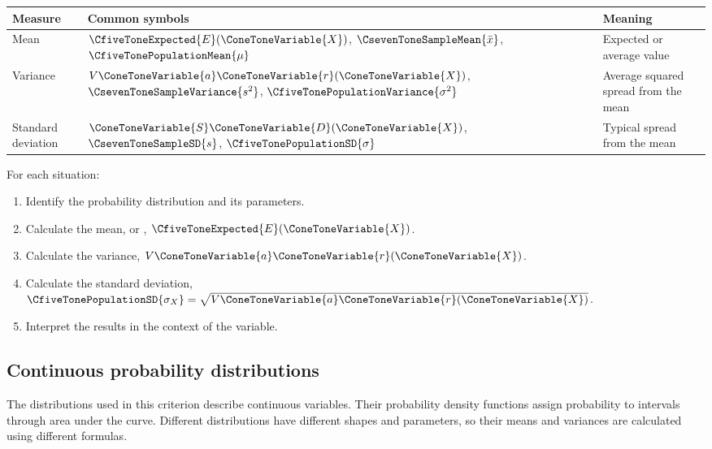 \begin{center}
	\renewcommand{\arraystretch}{1.2}
	\begin{tabular}{lll}
		\toprule
		Measure & Common symbols & Meaning \\
		\midrule
		Mean
		& $\CfiveToneExpected{E}(\ConeToneVariable{X})$, $\CsevenToneSampleMean{\bar{x}}$, $\CfiveTonePopulationMean{\mu}$
		& Expected or average value \\
		
		Variance
		& $V\ConeToneVariable{a}\ConeToneVariable{r}(\ConeToneVariable{X})$, $\CsevenToneSampleVariance{s^2}$, $\CfiveTonePopulationVariance{\sigma^2}$
		& Average squared spread from the mean \\
		
		Standard deviation
		& $\ConeToneVariable{S}\ConeToneVariable{D}(\ConeToneVariable{X})$, $\CsevenToneSampleSD{s}$, $\CfiveTonePopulationSD{\sigma}$
		& Typical spread from the mean \\
		\bottomrule
	\end{tabular}
\end{center}

For each situation:
\begin{enumerate}
	\item Identify the probability distribution and its parameters.
	\item Calculate the mean, or  , $\CfiveToneExpected{E}(\ConeToneVariable{X})$.
	\item Calculate the variance, $V\ConeToneVariable{a}\ConeToneVariable{r}(\ConeToneVariable{X})$.
	\item Calculate the standard deviation,
	$\CfiveTonePopulationSD{\sigma_X}=\sqrt{V\ConeToneVariable{a}\ConeToneVariable{r}(\ConeToneVariable{X})}$.
	\item Interpret the results in the context of the variable.
\end{enumerate}

	
	\subsection{Continuous probability distributions}\label{sec:c4-intro-distributions}
	
	The distributions used in this criterion describe continuous variables.  Their
	probability density functions assign probability to intervals through area
	under the curve.  Different distributions have different shapes and parameters,
	so their means and variances are calculated using different formulas.
	
